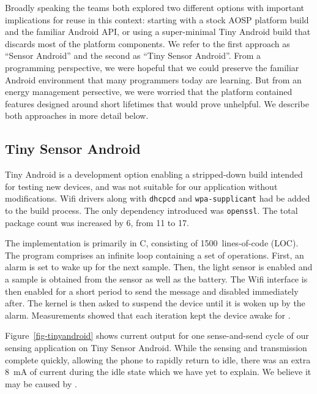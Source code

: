 
Broadly speaking the teams both explored two different options with important
implications for reuse in this context: starting with a stock AOSP platform
build and the familiar Android API, or using a super-minimal Tiny Android
build that discards most of the platform components. We refer to the first
approach as ``Sensor Android'' and the second as ``Tiny Sensor Android''.
From a programming perspective, we were hopeful that we could preserve the
familiar Android environment that many programmers today are learning. But
from an energy management persective, we were worried that the platform
contained features designed around short lifetimes that would prove
unhelpful. We describe both approaches in more detail below.

\subsection{Tiny Sensor Android}
\label{subsec-tiny}

Tiny Android is a development option enabling a stripped-down build intended
for testing new devices, and was not suitable for our application without
modifications. Wifi drivers along with \texttt{dhcpcd} and
\texttt{wpa-supplicant} had be added to the build process. The only
dependency introduced was \texttt{openssl}. The total package count was
increased by 6, from 11 to 17.

The implementation is primarily in C, consisting of 1500~lines-of-code
(LOC). The program comprises an infinite loop containing a set of operations. 
First, an alarm is set to wake up for the next sample. Then, the light
sensor is enabled and a sample is obtained from the sensor as well as the
battery. The Wifi interface is then enabled for a short period to send the
message and disabled immediately after. The kernel is then asked to suspend the
device until it is woken up by the alarm.
Measurements showed that each iteration kept the device awake for .

Figure~\ref{fig-tinyandroid} shows current output for one sense-and-send
cycle of our sensing application on Tiny Sensor Android. While the sensing
and transmission complete quickly, allowing the phone to rapidly return to
idle, there was an extra 8~mA of current during the idle state which we have
yet to explain. We believe it may be caused by .

